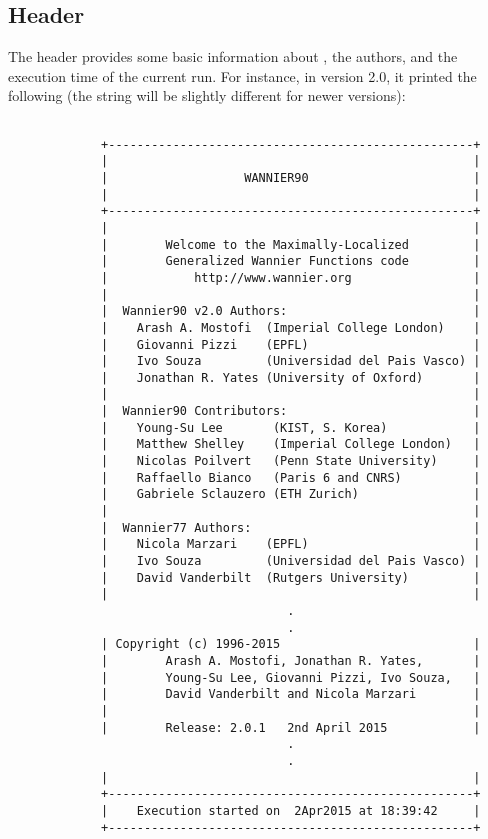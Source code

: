 \subsection{Header}

The header provides some basic information about \wannier, the
authors, and the execution time of the current run. For instance,
in version 2.0, it printed the following (the string will be 
slightly different for newer versions):

\begin{verbatim}

             +---------------------------------------------------+
             |                                                   |
             |                   WANNIER90                       |
             |                                                   |
             +---------------------------------------------------+
             |                                                   |
             |        Welcome to the Maximally-Localized         |
             |        Generalized Wannier Functions code         |
             |            http://www.wannier.org                 |
             |                                                   |
             |  Wannier90 v2.0 Authors:                          |
             |    Arash A. Mostofi  (Imperial College London)    |
             |    Giovanni Pizzi    (EPFL)                       |
             |    Ivo Souza         (Universidad del Pais Vasco) |
             |    Jonathan R. Yates (University of Oxford)       |
             |                                                   |
             |  Wannier90 Contributors:                          |
             |    Young-Su Lee       (KIST, S. Korea)            |
             |    Matthew Shelley    (Imperial College London)   |
             |    Nicolas Poilvert   (Penn State University)     |
             |    Raffaello Bianco   (Paris 6 and CNRS)          |
             |    Gabriele Sclauzero (ETH Zurich)                |
             |                                                   |
             |  Wannier77 Authors:                               |
             |    Nicola Marzari    (EPFL)                       |
             |    Ivo Souza         (Universidad del Pais Vasco) |
             |    David Vanderbilt  (Rutgers University)         |
             |                                                   |
                                       .
                                       .
             | Copyright (c) 1996-2015                           |
             |        Arash A. Mostofi, Jonathan R. Yates,       |
             |        Young-Su Lee, Giovanni Pizzi, Ivo Souza,   |
             |        David Vanderbilt and Nicola Marzari        |
             |                                                   |
             |        Release: 2.0.1   2nd April 2015            |
                                       .
                                       .
             |                                                   |
             +---------------------------------------------------+
             |    Execution started on  2Apr2015 at 18:39:42     |
             +---------------------------------------------------+


\end{verbatim}
